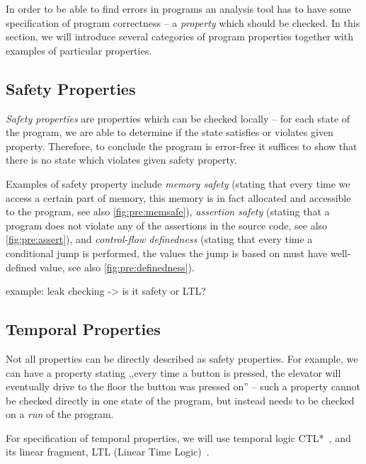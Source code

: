 In order to be able to find errors in programs an analysis tool has to have some specification of program correctness -- a \emph{property} which should be checked.
In this section, we will introduce several categories of program properties together with examples of particular properties.

\subsection{Safety Properties}

\emph{Safety properties} are properties which can be checked locally -- for each state of the program, we are able to determine if the state satisfies or violates given property.
Therefore, to conclude the program is error-free it suffices to show that there is no state which violates given safety property.

Examples of safety property include \emph{memory safety} (stating that every time we access a certain part of memory, this memory is in fact allocated and accessible to the program, see also \autoref{fig:pre:memsafe}), \emph{assertion safety} (stating that a program does not violate any of the assertions in the source code, see also \autoref{fig:pre:assert}), and \emph{control-flow definedness} (stating that every time a conditional jump is performed, the values the jump is based on must have well-defined value, see also \autoref{fig:pre:definedness}).

example: leak checking -> is it safety or LTL?

\subsection{Temporal Properties}

Not all properties can be directly described as safety properties.
For example, we can have a property stating ,,every time a button is pressed, the elevator will eventually drive to the floor the button was pressed on'' -- such a property cannot be checked directly in one state of the program, but instead needs to be checked on a \emph{run} of the program.

For specification of temporal properties, we will use temporal logic CTL*~\cite{todo}, and its linear fragment, LTL (Linear Time Logic)~\cite{TODO}.

\begin{definition}[CTL*]

\end{definition}

